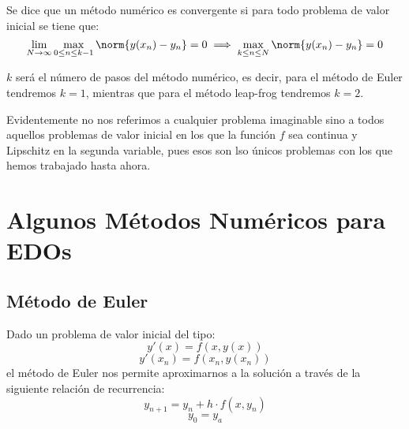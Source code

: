 \documentclass{apuntes}
\begin{document}
\begin{defn}
Se dice que un método numérico es convergente si para todo problema de valor inicial se tiene que:
\[\lim_{N \to \infty} \max_{0 \leq n \leq k-1}\norm{y(x_n)-y_n}= 0\implies \max_{k \leq n \leq N} \norm{y(x_n)-y_n}=0\]

$k$ será el número de pasos del método numérico, es decir, para el método de Euler tendremos $k=1$, mientras que para el método leap-frog tendremos $k=2$.

Evidentemente no nos referimos a cualquier problema imaginable sino a todos aquellos problemas de valor inicial en los que la función $f$ sea continua y Lipschitz en la segunda variable, pues esos son lso únicos problemas con los que hemos trabajado hasta ahora.
\end{defn}

\chapter{Algunos Métodos Numéricos para EDOs}
\section{Método de Euler}

Dado un problema de valor inicial del tipo:
\[y'(x) = f(x,y(x))\]
\[y'(x_n) = f(x_n,y(x_n))\]
el método de Euler nos permite aproximarnos a la solución a través de la siguiente relación de recurrencia:
\[y_{n+1} = y_n + h·f(x,y_n)\]
\[y_0=y_a\]
\end{document}
